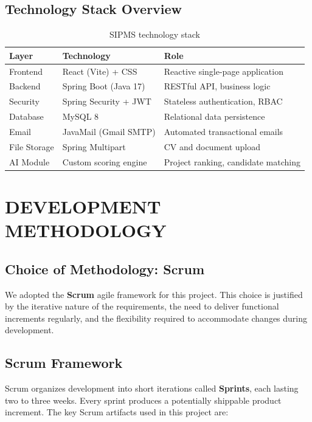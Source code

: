 \subsection{Technology Stack Overview}
\begin{table}[H]
\centering
\begin{tabular}{|p{3.5cm}|p{4cm}|p{5.5cm}|}
\hline
\rowcolor{gray!20}
\textbf{Layer} & \textbf{Technology} & \textbf{Role} \\
\hline
Frontend & React (Vite) + CSS & Reactive single-page application \\
\hline
Backend & Spring Boot (Java 17) & RESTful API, business logic \\
\hline
Security & Spring Security + JWT & Stateless authentication, RBAC \\
\hline
Database & MySQL 8 & Relational data persistence \\
\hline
Email & JavaMail (Gmail SMTP) & Automated transactional emails \\
\hline
File Storage & Spring Multipart & CV and document upload \\
\hline
AI Module & Custom scoring engine & Project ranking, candidate matching \\
\hline
\end{tabular}
\caption{SIPMS technology stack}
\end{table}

\section{DEVELOPMENT METHODOLOGY}

\subsection{Choice of Methodology: Scrum}
We adopted the \textbf{Scrum} agile framework for this project. This choice is justified by the iterative nature of the requirements, the need to deliver functional increments regularly, and the flexibility required to accommodate changes during development.

\subsection{Scrum Framework}
Scrum organizes development into short iterations called \textbf{Sprints}, each lasting two to three weeks. Every sprint produces a potentially shippable product increment. The key Scrum artifacts used in this project are:

